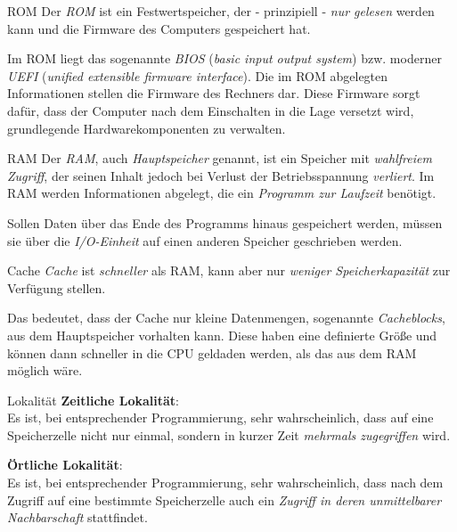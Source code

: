 \begin{defi}{ROM}
    Der \emph{ROM} ist ein Festwertspeicher, der - prinzipiell - \emph{nur gelesen} werden kann und die Firmware des Computers gespeichert hat.

    Im ROM liegt das sogenannte \emph{BIOS} (\emph{basic input output system}) bzw. moderner \emph{UEFI}
    (\emph{unified extensible firmware interface}).
    Die im ROM abgelegten Informationen stellen die Firmware des
    Rechners dar. Diese Firmware sorgt dafür, dass der Computer nach dem Einschalten
    in die Lage versetzt wird, grundlegende Hardwarekomponenten zu verwalten.
\end{defi}

\begin{defi}{RAM}
    Der \emph{RAM},
    auch \emph{Hauptspeicher} genannt, ist ein Speicher mit \emph{wahlfreiem Zugriff}, der seinen
    Inhalt jedoch bei Verlust der Betriebsspannung \emph{verliert}. Im RAM werden Informationen
    abgelegt, die ein \emph{Programm zur Laufzeit} benötigt.

    Sollen Daten
    über das Ende des Programms hinaus gespeichert werden, müssen sie über die
    \emph{I/O-Einheit} auf einen anderen Speicher geschrieben werden.
\end{defi}

\begin{defi}{Cache}
    \emph{Cache} ist \emph{schneller} als RAM, kann aber nur \emph{weniger Speicherkapazität} zur Verfügung stellen.

    Das bedeutet, dass der Cache nur kleine Datenmengen, sogenannte \emph{Cacheblocks}, aus dem Hauptspeicher vorhalten kann.
    Diese haben eine definierte Größe und können dann schneller in die CPU geldaden werden, als das aus dem RAM möglich wäre.
\end{defi}

\begin{defi}{Lokalität}
    \textbf{Zeitliche Lokalität}:\\
    Es ist, bei entsprechender Programmierung, sehr wahrscheinlich, dass
    auf eine Speicherzelle nicht nur einmal, sondern in kurzer Zeit \emph{mehrmals zugegriffen}
    wird.

    \textbf{Örtliche Lokalität}:\\
    Es ist, bei entsprechender Programmierung, sehr wahrscheinlich, dass nach
    dem Zugriff auf eine bestimmte Speicherzelle auch ein \emph{Zugriff in deren unmittelbarer
        \glqq Nachbarschaft\grqq} stattfindet.
\end{defi}

